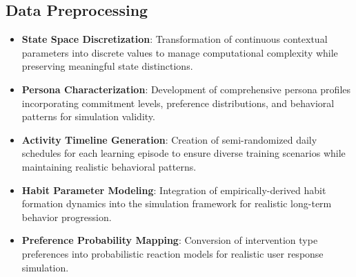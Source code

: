 \subsection*{Data Preprocessing}
\begin{itemize}
    \item \textbf{State Space Discretization}: Transformation of continuous contextual parameters into discrete values to manage computational complexity while preserving meaningful state distinctions.
    \item \textbf{Persona Characterization}: Development of comprehensive persona profiles incorporating commitment levels, preference distributions, and behavioral patterns for simulation validity.
    \item \textbf{Activity Timeline Generation}: Creation of semi-randomized daily schedules for each learning episode to ensure diverse training scenarios while maintaining realistic behavioral patterns.
    \item \textbf{Habit Parameter Modeling}: Integration of empirically-derived habit formation dynamics into the simulation framework for realistic long-term behavior progression.
    \item \textbf{Preference Probability Mapping}: Conversion of intervention type preferences into probabilistic reaction models for realistic user response simulation.
\end{itemize}

